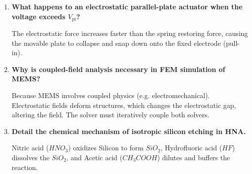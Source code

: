 \documentclass[12pt,a4paper]{article}
\newcommand{\Q}[1]{\textbf{#1}\par\noindent\ignorespaces}
\begin{document}
\begin{tcolorbox}[exambox, title={\textbf{Frequently Asked / Viva Questions}}]
\begin{enumerate}[topsep=0pt, label=\textbf{Q\arabic*.}, itemsep=5pt]
  \item \Q{What happens to an electrostatic parallel-plate actuator when the voltage exceeds $V_{\text{pi}}$?}
    The electrostatic force increases faster than the spring restoring force, causing the movable plate to collapse and snap down onto the fixed electrode (pull-in).
  \item \Q{Why is coupled-field analysis necessary in FEM simulation of MEMS?}
    Because MEMS involves coupled physics (e.g. electromechanical). Electrostatic fields deform structures, which changes the electrostatic gap, altering the field. The solver must iteratively couple both solvers.
  \item \Q{Detail the chemical mechanism of isotropic silicon etching in HNA.}
    Nitric acid ($HNO_3$) oxidizes Silicon to form $SiO_2$, Hydrofluoric acid ($HF$) dissolves the $SiO_2$, and Acetic acid ($CH_3COOH$) dilutes and buffers the reaction.
\end{enumerate}
\end{tcolorbox}
\end{document}
